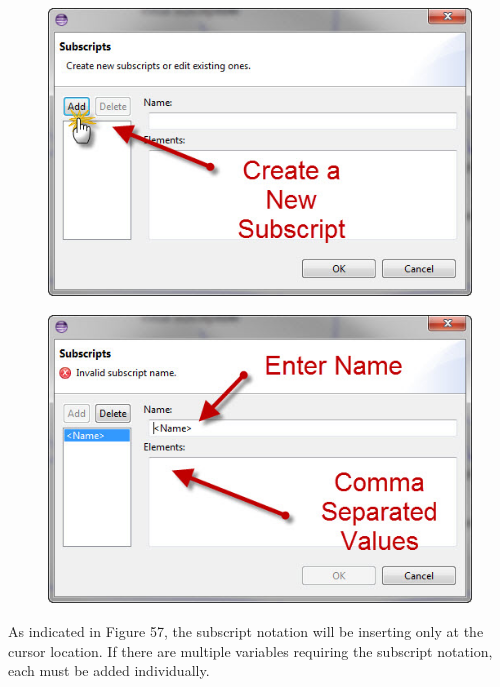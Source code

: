 \documentclass[11pt]{amsart}
\begin{document}
\begin{figure}[ht]
\begin{center}
\vspace{.2in}
\centerline {
\includegraphics[totalheight=0.3\textheight]{images/053.jpg}
}
\caption{}
\label{fig:053}
\end{center}
\end{figure}


\begin{figure}[ht]
\begin{center}
\vspace{.2in}
\centerline {
\includegraphics[totalheight=0.3\textheight]{images/054.jpg}
}
\caption{}
\label{fig:054}
\end{center}
\end{figure}

As indicated in Figure 57, the subscript notation will be inserting only at the cursor location. If there are multiple variables requiring the subscript notation, each must be added individually.
\end{document}
